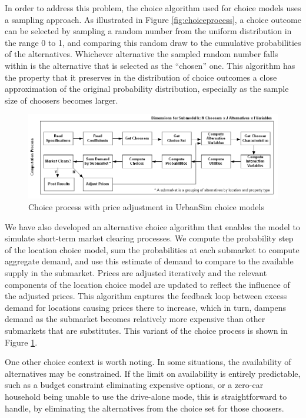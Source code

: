 In order to address this problem, the choice algorithm used for choice models uses a sampling approach. As illustrated in Figure \ref{fig:choiceprocess}, a choice outcome can be selected by sampling a random number from the uniform distribution in the range 0 to 1, and comparing this random draw to the cumulative probabilities of the alternatives. Whichever alternative the sampled random number falls within is the alternative that is selected as the \enquote{chosen} one. This algorithm has the property that it preserves in the distribution of choice outcomes a close approximation of the original probability distribution, especially as the sample size of choosers becomes larger.

\begin{figure}[htbp]
    \center
    \includegraphics[width=\textwidth]
    {graphics/ChoiceProcessWithPriceAdjustment.png}
    \caption{Choice process with price adjustment in UrbanSim choice models}
    \label{fig:choiceprocesswithprice}
\end{figure}

We have also developed an alternative choice algorithm that enables the model to simulate short-term market clearing
processes. We compute the probability step of the location choice model, sum the probabilities at each submarket to compute
aggregate demand, and use this estimate of demand to compare to the available supply in the submarket. Prices are adjusted
iteratively and the relevant components of the location choice model are updated to reflect the influence of the adjusted
prices. This algorithm captures the feedback loop between excess demand for locations causing prices there
to increase, which in turn, dampens demand as the submarket becomes relatively more expensive than other submarkets that
are substitutes. This variant of the choice process is shown in Figure \ref{fig:choiceprocesswithprice}.

One other choice context is worth noting. In some situations, the availability of alternatives may be constrained. If the limit on availability is entirely predictable, such as a budget constraint eliminating expensive options, or a zero-car household being unable to use the drive-alone mode, this is straightforward to handle, by eliminating the alternatives from the choice set for those choosers. 

